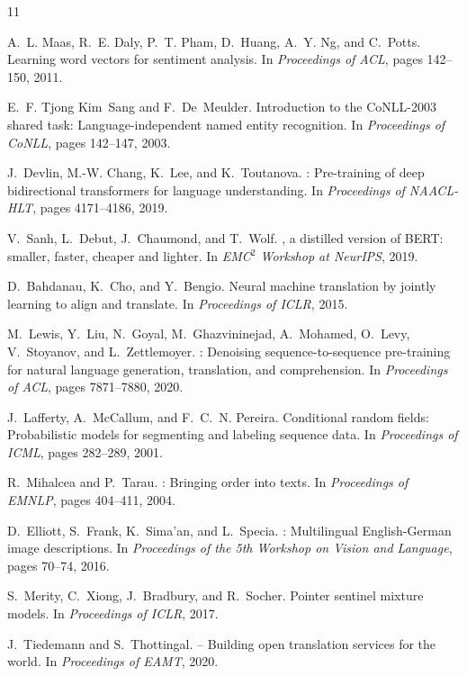 \documentclass[11pt,a4paper]{article}
\begin{document}

\begin{thebibliography}{11}

A.~L. Maas, R.~E. Daly, P.~T. Pham, D.~Huang, A.~Y. Ng, and C.~Potts.
\newblock Learning word vectors for sentiment analysis.
\newblock In \emph{Proceedings of ACL}, pages 142--150, 2011.

E.~F. Tjong Kim~Sang and F.~De~Meulder.
\newblock Introduction to the CoNLL-2003 shared task: Language-independent named entity recognition.
\newblock In \emph{Proceedings of CoNLL}, pages 142--147, 2003.

J.~Devlin, M.-W. Chang, K.~Lee, and K.~Toutanova.
: Pre-training of deep bidirectional transformers for language understanding.
\newblock In \emph{Proceedings of NAACL-HLT}, pages 4171--4186, 2019.

V.~Sanh, L.~Debut, J.~Chaumond, and T.~Wolf.
, a distilled version of {BERT}: smaller, faster, cheaper and lighter.
\newblock In \emph{EMC$^2$ Workshop at NeurIPS}, 2019.

D.~Bahdanau, K.~Cho, and Y.~Bengio.
\newblock Neural machine translation by jointly learning to align and translate.
\newblock In \emph{Proceedings of ICLR}, 2015.

M.~Lewis, Y.~Liu, N.~Goyal, M.~Ghazvininejad, A.~Mohamed, O.~Levy, V.~Stoyanov, and L.~Zettlemoyer.
: Denoising sequence-to-sequence pre-training for natural language generation, translation, and comprehension.
\newblock In \emph{Proceedings of ACL}, pages 7871--7880, 2020.

J.~Lafferty, A.~McCallum, and F.~C.~N. Pereira.
\newblock Conditional random fields: Probabilistic models for segmenting and labeling sequence data.
\newblock In \emph{Proceedings of ICML}, pages 282--289, 2001.

R.~Mihalcea and P.~Tarau.
: Bringing order into texts.
\newblock In \emph{Proceedings of EMNLP}, pages 404--411, 2004.

D.~Elliott, S.~Frank, K.~Sima'an, and L.~Specia.
: Multilingual {English-German} image descriptions.
\newblock In \emph{Proceedings of the 5th Workshop on Vision and Language}, pages 70--74, 2016.

S.~Merity, C.~Xiong, J.~Bradbury, and R.~Socher.
\newblock Pointer sentinel mixture models.
\newblock In \emph{Proceedings of ICLR}, 2017.

J.~Tiedemann and S.~Thottingal.
 -- Building open translation services for the world.
\newblock In \emph{Proceedings of EAMT}, 2020.

\end{thebibliography}
\end{document}
